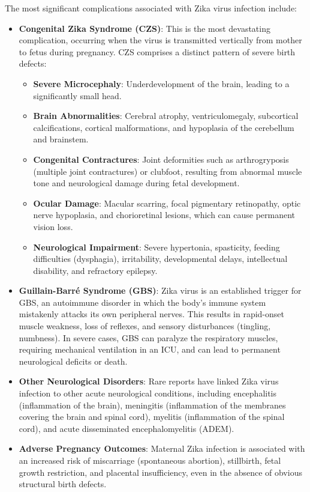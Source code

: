 The most significant complications associated with Zika virus infection include:
\begin{itemize}
    \item \textbf{Congenital Zika Syndrome (CZS)}: This is the most devastating complication, occurring when the virus is transmitted vertically from mother to fetus during pregnancy. CZS comprises a distinct pattern of severe birth defects:
    \begin{itemize}
        \item \textbf{Severe Microcephaly}: Underdevelopment of the brain, leading to a significantly small head.
        \item \textbf{Brain Abnormalities}: Cerebral atrophy, ventriculomegaly, subcortical calcifications, cortical malformations, and hypoplasia of the cerebellum and brainstem.
        \item \textbf{Congenital Contractures}: Joint deformities such as arthrogryposis (multiple joint contractures) or clubfoot, resulting from abnormal muscle tone and neurological damage during fetal development.
        \item \textbf{Ocular Damage}: Macular scarring, focal pigmentary retinopathy, optic nerve hypoplasia, and chorioretinal lesions, which can cause permanent vision loss.
        \item \textbf{Neurological Impairment}: Severe hypertonia, spasticity, feeding difficulties (dysphagia), irritability, developmental delays, intellectual disability, and refractory epilepsy.
    \end{itemize}
    \item \textbf{Guillain-Barr\'e Syndrome (GBS)}: Zika virus is an established trigger for GBS, an autoimmune disorder in which the body's immune system mistakenly attacks its own peripheral nerves. This results in rapid-onset muscle weakness, loss of reflexes, and sensory disturbances (tingling, numbness). In severe cases, GBS can paralyze the respiratory muscles, requiring mechanical ventilation in an ICU, and can lead to permanent neurological deficits or death.
    \item \textbf{Other Neurological Disorders}: Rare reports have linked Zika virus infection to other acute neurological conditions, including encephalitis (inflammation of the brain), meningitis (inflammation of the membranes covering the brain and spinal cord), myelitis (inflammation of the spinal cord), and acute disseminated encephalomyelitis (ADEM).
    \item \textbf{Adverse Pregnancy Outcomes}: Maternal Zika infection is associated with an increased risk of miscarriage (spontaneous abortion), stillbirth, fetal growth restriction, and placental insufficiency, even in the absence of obvious structural birth defects.
\end{itemize}

